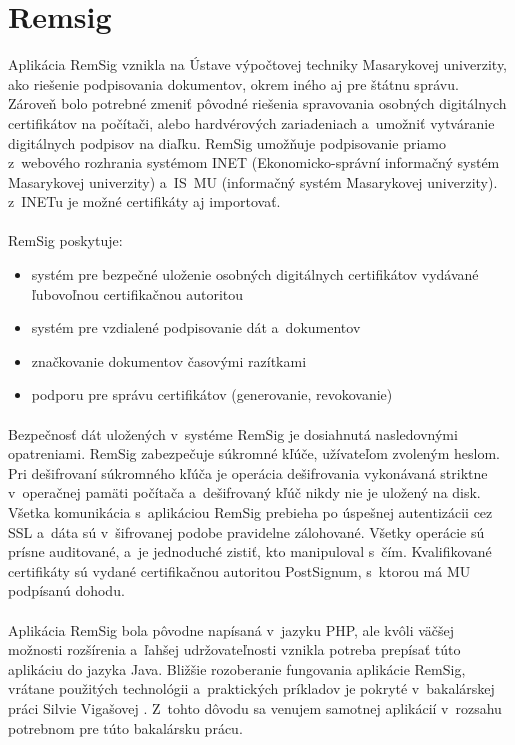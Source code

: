 \documentclass[
  digital, %
  table,   %
oneside,
  nolof,     %
  nolot,     %
]{fithesis3}
\begin{document}
\section{Remsig}
Aplikácia RemSig \cite{remsigMuni} vznikla na Ústave výpočtovej techniky Masarykovej univerzity, ako riešenie podpisovania dokumentov, okrem iného aj pre štátnu správu. Zároveň bolo potrebné zmeniť pôvodné riešenia spravovania osobných digitálnych certifikátov na počítači, alebo hardvérových zariadeniach a~umožniť vytváranie digitálnych podpisov na diaľku. RemSig umožňuje podpisovanie priamo z~webového rozhrania systémom INET (Ekonomicko-správní informačný systém Masarykovej univerzity) a~IS~MU (informačný systém Masarykovej univerzity). z~INETu je možné certifikáty aj importovať.\paragraph{}
RemSig poskytuje:
\begin{itemize}
\item systém pre bezpečné uloženie osobných digitálnych certifikátov vydávané ľubovoľnou certifikačnou autoritou
\item systém pre vzdialené podpisovanie dát a~dokumentov
\item značkovanie dokumentov časovými razítkami 
\item podporu pre správu certifikátov (generovanie, revokovanie)

 \end{itemize}

\paragraph{}
Bezpečnosť dát uložených v~systéme RemSig je dosiahnutá nasledovnými opatreniami. RemSig zabezpečuje súkromné kľúče, užívateľom zvoleným heslom. Pri dešifrovaní súkromného kľúča je operácia dešifrovania vykonávaná striktne v~operačnej pamäti počítača a~dešifrovaný kľúč nikdy nie je uložený na disk. Všetka komunikácia s~aplikáciou RemSig prebieha po úspešnej autentizácii cez SSL a~dáta sú v~šifrovanej podobe pravidelne zálohované. Všetky operácie sú prísne auditované, a~je jednoduché zistiť, kto manipuloval s~čím. Kvalifikované certifikáty sú vydané certifikačnou autoritou PostSignum, s~ktorou má MU podpísanú dohodu.
\paragraph{}
Aplikácia RemSig bola pôvodne napísaná v~jazyku PHP, ale kvôli väčšej možnosti rozšírenia a~ľahšej udržovateľnosti \cite{javaVsPHP} vznikla potreba prepísať túto aplikáciu do jazyka Java.  Bližšie rozoberanie fungovania aplikácie RemSig, vrátane použitých technológii a~praktických príkladov je pokryté v~bakalárskej práci Silvie Vigašovej \cite{remsigSilvia}. Z~tohto dôvodu sa venujem samotnej aplikácií  v~rozsahu potrebnom pre túto bakalársku prácu. 
\end{document}
